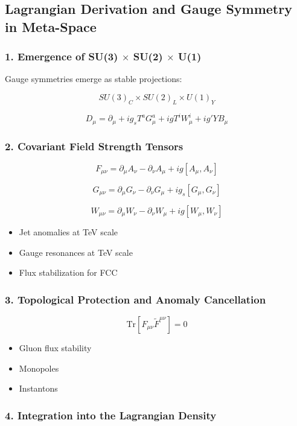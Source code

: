 \documentclass[10.5pt,a4paper]{article}
\begin{document}
\subsection{Lagrangian Derivation and Gauge Symmetry in Meta-Space}

\subsubsection*{1. Emergence of SU(3) \(\times\) SU(2) \(\times\) U(1)}

Gauge symmetries emerge as stable projections:

\[
    SU(3)_C \times SU(2)_L \times U(1)_Y
\]

\[
    D_\mu = \partial_\mu + i g_s T^a G^a_\mu + i g T^i W^i_\mu + i g' Y B_\mu
\]

\subsubsection*{2. Covariant Field Strength Tensors}

\[
    F_{\mu\nu} = \partial_\mu A_\nu - \partial_\nu A_\mu + i g [A_\mu, A_\nu]
\] 

\[
    G_{\mu\nu} = \partial_\mu G_\nu - \partial_\nu G_\mu + i g_s [G_\mu, G_\nu]
\] 

\[
    W_{\mu\nu} = \partial_\mu W_\nu - \partial_\nu W_\mu + i g [W_\mu, W_\nu]
\]


\begin{itemize}
    \item Jet anomalies at TeV scale
    \item Gauge resonances at TeV scale
    \item Flux stabilization for FCC
\end{itemize}

\subsubsection*{3. Topological Protection and Anomaly Cancellation}

\[
    \mathrm{Tr} [F_{\mu\nu} \tilde{F}^{\mu\nu}] = 0
\]

\begin{itemize}
    \item Gluon flux stability
    \item Monopoles
    \item Instantons
\end{itemize}

\subsubsection*{4. Integration into the Lagrangian Density}
\end{document}
